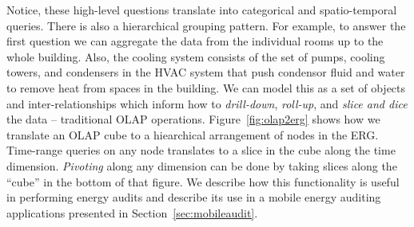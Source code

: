 Notice, these high-level questions translate into categorical and spatio-temporal queries.
There is also a hierarchical grouping pattern.  For example, to answer the first question we can
aggregate the data from the individual rooms up to the whole building.  
Also, the cooling system consists of the set of pumps, cooling towers, and condensers in the HVAC system that push condensor
fluid and water to remove heat from spaces in the building.  We can model this as a set of objects and inter-relationships which inform how
to \emph{drill-down}, \emph{roll-up}, and \emph{slice and dice} the data -- traditional OLAP operations.
Figure~\ref{fig:olap2erg} shows how we translate an OLAP cube to a hiearchical arrangement of 
nodes in the ERG.  Time-range queries on any node translates to a slice in the cube along the time dimension.
\emph{Pivoting} along any dimension can be done by taking slices along the ``cube'' in the bottom of that
figure.
We describe how this functionality is useful in performing energy audits and describe its use in
a mobile energy auditing applications presented in Section~\ref{sec:mobileaudit}.



